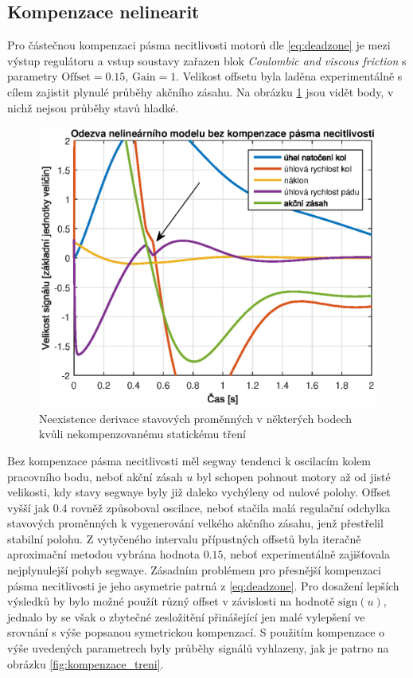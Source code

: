 \documentclass[conference]{IEEEtran}
\begin{document}
\subsection{Kompenzace nelinearit}
 Pro částečnou kompenzaci pásma necitlivosti motorů dle \eqref{eq:deadzone} je mezi výstup regulátoru a vstup soustavy
zařazen blok \textit{Coulombic and viscous friction} s parametry $\text{Offset} = 0.15$, $\text{Gain} = 1$. Velikost offsetu byla laděna
experimentálně s cílem zajistit plynulé průběhy akčního zásahu. Na obrázku \ref{fig:bez_kompenzace_treni} jsou vidět body, v nichž nejsou průběhy stavů hladké.
\begin{figure}[htbp]
    \centerline{\includegraphics[width=\linewidth]{regulace_bez_kompenzace_treni.eps}}
    \caption{Neexistence derivace stavových proměnných v některých bodech kvůli nekompenzovanému statickému tření}
    \label{fig:bez_kompenzace_treni}        
\end{figure}

Bez kompenzace pásma necitlivosti měl segway tendenci k oscilacím kolem pracovního bodu, neboť akční zásah $u$ byl schopen pohnout motory
až od jisté velikosti, kdy stavy segwaye byly již daleko vychýleny od nulové polohy.
Offset vyšší jak $0.4$ rovněž způsoboval oscilace, neboť stačila malá regulační odchylka stavových proměnných k vygenerování velkého akčního zásahu,
jenž přestřelil stabilní polohu.
Z vytyčeného intervalu přípustných offsetů byla iteračně aproximační metodou vybrána hodnota $0.15$,
neboť experimentálně zajišťovala nejplynulejší pohyb segwaye.
Zásadním problémem pro přesnější kompenzaci pásma necitlivosti je jeho asymetrie patrná z \eqref{eq:deadzone}. Pro dosažení lepších výsledků by bylo možné
použít různý offset v závislosti na hodnotě $\text{sign}(u)$, jednalo by se však o zbytečné zesložitění přinášející jen malé vylepšení
ve srovnání s výše popsanou symetrickou kompenzací.
S použitím kompenzace o výše uvedených parametrech byly průběhy signálů vyhlazeny, jak je patrno na obrázku \ref{fig:kompenzace_treni}. 
\end{document}
